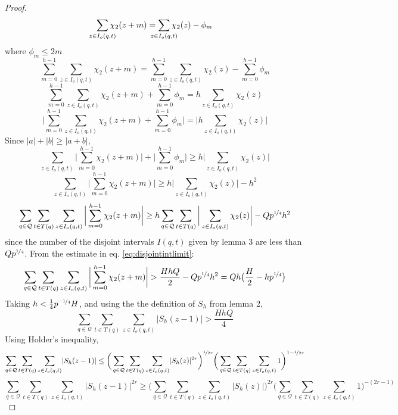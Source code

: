 \documentclass{report}
\begin{document}
\begin{proof}
$$\sum\limits_{\mathclap {z\in I_o(q,t)}}\chi_2(z+m) = \sum\limits_{\mathclap{z\in I_o(q,t)}}\chi_2(z)- \phi_m$$
where $\phi_m\leq 2m$
$$\sum\limits_{m=0}^{h-1}\sum\limits_{z\in I_o(q,t)}\chi_2(z+m) = \sum\limits_{m=0}^{h-1}\sum\limits_{z\in I_o(q,t)}\chi_2(z)- \sum\limits_{m=0}^{h-1}\phi_m$$
$$\sum\limits_{m=0}^{h-1}\sum\limits_{z\in I_o(q,t)}\chi_2(z+m) + \sum\limits_{m=0}^{h-1}\phi_m= h\sum\limits_{z\in I_o(q,t)}\chi_2(z)$$
$$\bigg \lvert\sum\limits_{m=0}^{h-1}\sum\limits_{z\in I_o(q,t)}\chi_2(z+m) + \sum\limits_{m=0}^{h-1}\phi_m \bigg \rvert= \bigg \lvert h\sum\limits_{z\in I_o(q,t)}\chi_2(z)\bigg \rvert$$
Since $\lvert a\rvert + \lvert b\rvert \geq \lvert a+b \rvert$,
$$\sum\limits_{z\in I_o(q,t)}\bigg \lvert \sum\limits_{m=0}^{h-1}\chi_2(z+m) \bigg \rvert + \bigg\lvert\sum\limits_{m=0}^{h-1}\phi_m\bigg\rvert \geq h\bigg \lvert \sum\limits_{z\in I_o(q,t)}\chi_2(z)\bigg \rvert$$
$$\sum\limits_{z\in I_o(q,t)}\bigg \lvert \sum\limits_{m=0}^{h-1}\chi_2(z+m) \bigg \rvert \geq h\bigg \lvert \sum\limits_{z\in I_o(q,t)}\chi_2(z)\bigg \rvert-h^2 $$
\[
\sum_{q\in\mathcal{Q}}\sum\limits_{t\in T(q)}\sum\limits_{z\in I_o(q,t)}\bigg \lvert \sum\limits_{m=0}^{h-1}\chi_2(z+m) \bigg \rvert \geq h\sum_{q\in\mathcal{Q}}\sum\limits_{t\in T(q)}\bigg \lvert \sum\limits_{z\in I_o(q,t)}\chi_2(z)\bigg \rvert-Qp^{\nicefrac{1}{4}}h^2
\]
since the number of the disjoint intervals $I(q,t)$ given by lemma 3 are less than $Qp^{\nicefrac{1}{4}}$. From the estimate in eq. \ref{eq:disjointintlimit}:
$$\sum_{q\in\mathcal{Q}}\sum\limits_{t\in T(q)}\sum\limits_{z\in I_o(q,t)}\bigg \lvert \sum\limits_{m=0}^{h-1}\chi_2(z+m) \bigg \rvert > \frac{HhQ}{2}-Qp^{\nicefrac{1}{4}} h^2=Qh\big(\frac{H}{2}-hp^{\nicefrac{1}{4}}\big)$$
Taking $h<\frac{1}{4}p^{\nicefrac{-1}{4}}H$, and using the the definition of $S_h$ from lemma 2,
$$\sum_{q\in\mathcal{Q}}\sum\limits_{t\in T(q)}\sum\limits_{z\in I_o(q,t)}\lvert S_h(z-1) \rvert > \frac{HhQ}{4}$$
Using Holder's inequality,
$$\sum_{q\in\mathcal{Q}}\sum\limits_{t\in T(q)}\sum\limits_{z\in I_o(q,t)}\lvert S_h(z-1) \rvert \leq \bigg ( \sum_{q\in\mathcal{Q}}\sum\limits_{t\in T(q)}\sum\limits_{z\in I_o(q,t)}\lvert S_h(z) \rvert^{2r} \bigg )^{\nicefrac{1}{2r}}\bigg ( \sum_{q\in\mathcal{Q}}\sum\limits_{t\in T(q)}\sum\limits_{z\in I_o(q,t)}1 \bigg )^{1-\nicefrac{1}{2r}}$$
$$\sum_{q\in\mathcal{Q}}\sum\limits_{t\in T(q)}\sum\limits_{z\in I_o(q,t)}\lvert S_h(z-1) \rvert^{2r} \geq \bigg ( \sum_{q\in\mathcal{Q}}\sum\limits_{t\in T(q)}\sum\limits_{z\in I_o(q,t)}\lvert S_h(z) \rvert \bigg )^{2r} \bigg ( \sum_{q\in\mathcal{Q}}\sum\limits_{t\in T(q)}\sum\limits_{z\in I_o(q,t)}1 \bigg )^{-(2r-1)}$$

\end{proof}
\end{document}
